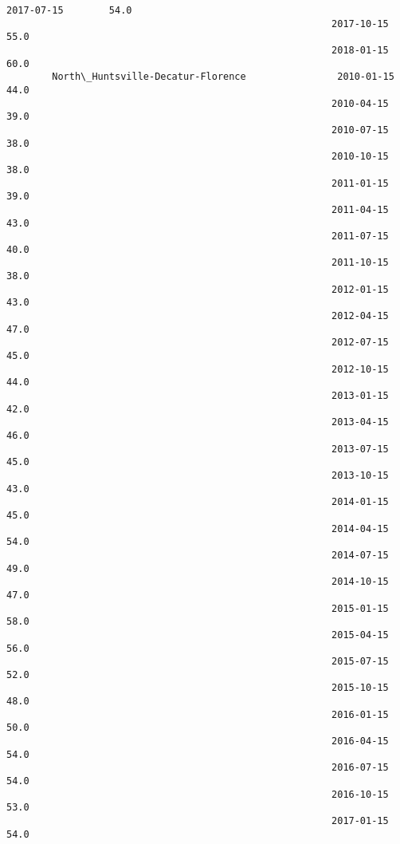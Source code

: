 \documentclass[11pt]{article}
\begin{document}
\begin{Verbatim}[commandchars=\\\{\}]
                                                         2017-07-15        54.0  
                                                         2017-10-15        55.0  
                                                         2018-01-15        60.0  
        North\_Huntsville-Decatur-Florence                2010-01-15        44.0  
                                                         2010-04-15        39.0  
                                                         2010-07-15        38.0  
                                                         2010-10-15        38.0  
                                                         2011-01-15        39.0  
                                                         2011-04-15        43.0  
                                                         2011-07-15        40.0  
                                                         2011-10-15        38.0  
                                                         2012-01-15        43.0  
                                                         2012-04-15        47.0  
                                                         2012-07-15        45.0  
                                                         2012-10-15        44.0  
                                                         2013-01-15        42.0  
                                                         2013-04-15        46.0  
                                                         2013-07-15        45.0  
                                                         2013-10-15        43.0  
                                                         2014-01-15        45.0  
                                                         2014-04-15        54.0  
                                                         2014-07-15        49.0  
                                                         2014-10-15        47.0  
                                                         2015-01-15        58.0  
                                                         2015-04-15        56.0  
                                                         2015-07-15        52.0  
                                                         2015-10-15        48.0  
                                                         2016-01-15        50.0  
                                                         2016-04-15        54.0  
                                                         2016-07-15        54.0  
                                                         2016-10-15        53.0  
                                                         2017-01-15        54.0  

\end{Verbatim}
\end{document}
